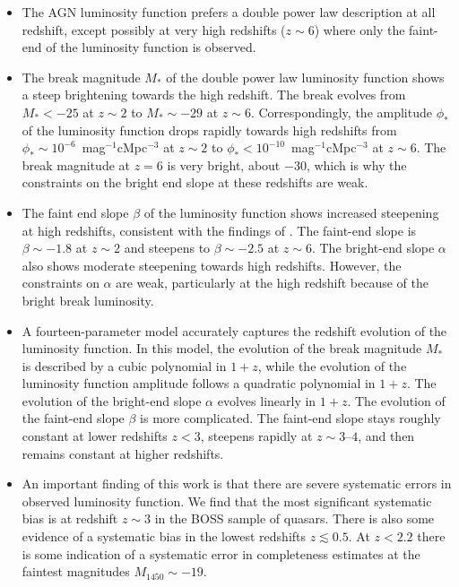 \documentclass[a4paper,fleqn,usenatbib]{mnras}
\begin{document}
\begin{itemize}
\item The AGN luminosity function prefers a double power law
  description at all redshift, except possibly at very high redshifts
  ($z\sim 6$) where only the faint-end of the luminosity function is
  observed.

\item The break magnitude $M_*$ of the double power law luminosity
  function shows a steep brightening towards the high redshift.  The
  break evolves from $M_*<-25$ at $z\sim 2$ to $M_*\sim -29$ at $z\sim
  6$.  Correspondingly, the amplitude $\phi_*$ of the luminosity
  function drops rapidly towards high redshifts from $\phi_*\sim
  10^{-6}$~mag$^{-1}$cMpc$^{-3}$ at $z\sim 2$ to $\phi_*<
  10^{-10}$~mag$^{-1}$cMpc$^{-3}$ at $z\sim 6$.  The break magnitude
  at $z=6$ is very bright, about $-30$, which is why the constraints
  on the bright end slope at these redshifts are weak.

\item The faint end slope $\beta$ of the luminosity function shows
  increased steepening at high redshifts, consistent with the findings
  of \citep{2015AA...578A..83G}.  The faint-end slope is $\beta\sim
  -1.8$ at $z\sim 2$ and steepens to $\beta\sim-2.5$ at $z\sim 6$.
  The bright-end slope $\alpha$ also shows moderate steepening towards
  high redshifts.  However, the constraints on $\alpha$ are weak,
  particularly at the high redshift because of the bright break
  luminosity.

\item A fourteen-parameter model accurately captures the redshift
  evolution of the luminosity function.  In this model, the evolution
  of the break magnitude $M_*$ is described by a cubic polynomial in
  $1+z$, while the evolution of the luminosity function amplitude
  follows a quadratic polynomial in $1+z$.  The evolution of the
  bright-end slope $\alpha$ evolves linearly in $1+z$.  The evolution
  of the faint-end slope $\beta$ is more complicated.  The faint-end
  slope stays roughly constant at lower redshifts $z<3$, steepens
  rapidly at $z\sim 3$--$4$, and then remains constant at higher
  redshifts.

\item An important finding of this work is that there are severe
  systematic errors in observed luminosity function.  We find that the
  most significant systematic bias is at redshift $z\sim 3$ in the
  BOSS sample of quasars.  There is also some evidence of a systematic
  bias in the lowest redshifts $z\lesssim 0.5$.  At $z<2.2$ there is
  some indication of a systematic error in completeness estimates at
  the faintest magnitudes $M_{1450}\sim -19$.  


\end{itemize}
\end{document}
